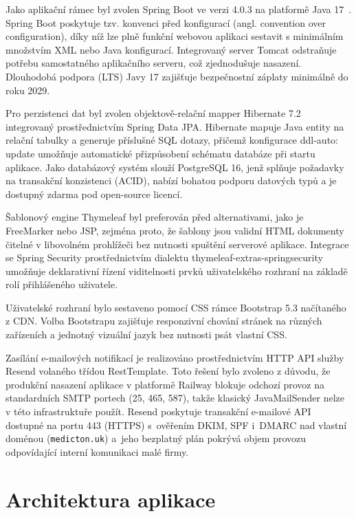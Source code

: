 Jako aplikační rámec byl zvolen Spring Boot ve verzi 4.0.3 na platformě Java 17~\cite{ref19}. Spring Boot poskytuje tzv. konvenci před konfigurací (angl. convention over configuration), díky níž lze plně funkční webovou aplikaci sestavit s minimálním množstvím XML nebo Java konfigurací. Integrovaný server Tomcat odstraňuje potřebu samostatného aplikačního serveru, což zjednodušuje nasazení. Dlouhodobá podpora (LTS) Javy 17 zajišťuje bezpečnostní záplaty minimálně do roku 2029.

Pro perzistenci dat byl zvolen objektově-relační mapper Hibernate 7.2 integrovaný prostřednictvím Spring Data JPA. Hibernate mapuje Java entity na relační tabulky a generuje příslušné SQL dotazy, přičemž konfigurace ddl-auto: update umožňuje automatické přizpůsobení schématu databáze při startu aplikace. Jako databázový systém slouží PostgreSQL 16, jenž splňuje požadavky na transakční konzistenci (ACID), nabízí bohatou podporu datových typů a je dostupný zdarma pod open-source licencí.

Šablonový engine Thymeleaf byl preferován před alternativami, jako je FreeMarker nebo JSP, zejména proto, že šablony jsou validní HTML dokumenty čitelné v libovolném prohlížeči bez nutnosti spuštění serverové aplikace. Integrace se Spring Security prostřednictvím dialektu thymeleaf-extras-springsecurity umožňuje deklarativní řízení viditelnosti prvků uživatelského rozhraní na základě rolí přihlášeného uživatele.

Uživatelské rozhraní bylo sestaveno pomocí CSS rámce Bootstrap 5.3 načítaného z CDN. Volba Bootstrapu zajišťuje responzivní chování stránek na různých zařízeních a jednotný vizuální jazyk bez nutnosti psát vlastní CSS.

Zasílání e-mailových notifikací je realizováno prostřednictvím HTTP API služby Resend volaného třídou RestTemplate. Toto řešení bylo zvoleno z důvodu, že produkční nasazení aplikace v platformě Railway blokuje odchozí provoz na standardních SMTP portech (25, 465, 587), takže klasický JavaMailSender nelze v této infrastruktuře použít. Resend poskytuje transakční e-mailové API dostupné na portu 443 (HTTPS) s~ověřením DKIM, SPF i~DMARC nad vlastní doménou (\texttt{medicton.uk}) a~jeho bezplatný plán pokrývá objem provozu odpovídající interní komunikaci malé firmy.


\section{Architektura aplikace}

